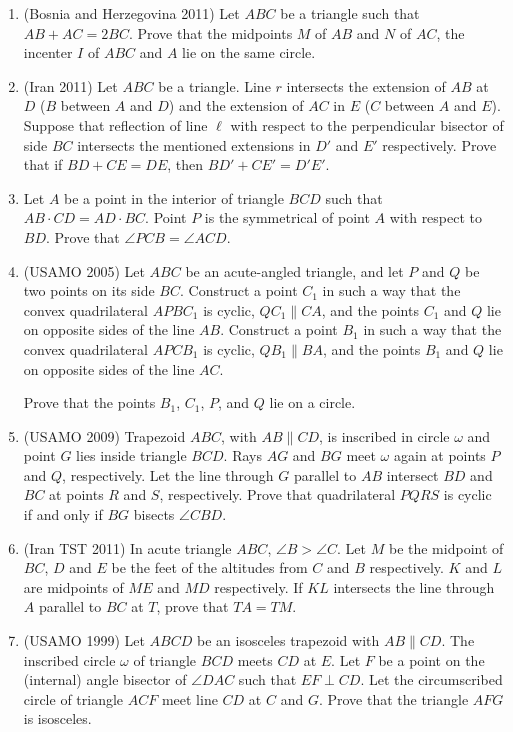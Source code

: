 \documentclass[10pt]{article}
\theoremstyle{definition}
\theoremstyle{remark}
\begin{document}
\begin{enumerate}
\item (Bosnia and Herzegovina 2011) Let $ABC$ be a triangle such that $AB + AC = 2BC$. Prove that the midpoints $M$ of $AB$ and $N$ of $AC$, the incenter $I$ of $ABC$ and $A$ lie on the same circle.

\item (Iran 2011) Let $ABC$ be a triangle. Line $r$ intersects the extension of $AB$ at $D$ ($B$ between $A$ and $D$) and the extension of $AC$ in $E$ ($C$ between $A$ and $E$). Suppose that reflection of line $\ell$ with respect to the perpendicular bisector of side $BC$ intersects the mentioned extensions in $D'$ and $E'$ respectively. Prove that if $BD + CE = DE$, then $BD' + CE' = D'E'$.

\item Let $A$ be a point in the interior of triangle $BCD$ such that $AB\cdot CD = AD\cdot BC$. Point $P$ is the symmetrical of point $A$ with respect to $BD$. Prove that $\angle PCB=\angle ACD$.

\item (USAMO 2005) Let $ABC$ be an acute-angled triangle, and let $P$ and $Q$ be two points on its side $BC$. Construct a point $C_1$ in such a way that the convex quadrilateral $APBC_1$ is cyclic, $QC_1\parallel CA$, and the points $C_1$ and $Q$ lie on opposite sides of the line $AB$. Construct a point $B_1$ in such a way that the convex quadrilateral $APCB_1$ is cyclic, $QB_1\parallel BA$, and the points $B_1$ and $Q$ lie on opposite sides of the line $AC$.

Prove that the points $B_1$, $C_1$, $P$, and $Q$ lie on a circle.

\item (USAMO 2009) Trapezoid $ABC$, with $AB \parallel CD$, is inscribed in circle $\omega$ and point $G$ lies inside triangle $BCD$. Rays $AG$ and  $BG$ meet $\omega$ again at points $P$ and $Q$, respectively. Let the line through $G$ parallel to $AB$ intersect $BD$ and $BC$ at points $R$ and $S$, respectively. Prove that quadrilateral $PQRS$ is cyclic if and only if $BG$ bisects $\angle CBD$.

\item (Iran TST 2011) In acute triangle $ABC$, $\angle B > \angle C$. Let $M$ be the midpoint of $BC$, $D$ and $E$ be the feet of the altitudes from $C$ and $B$ respectively. $K$ and $L$ are midpoints of $ME$ and $MD$ respectively. If $KL$ intersects the line through $A$ parallel to $BC$ at $T$, prove that $TA = TM$.

\item (USAMO 1999) Let $ABCD$ be an isosceles trapezoid with $AB \parallel CD$. The inscribed circle $\omega$ of triangle $BCD$ meets $CD$ at $E$. Let $F$ be a point on the (internal) angle bisector of $\angle DAC$ such that $EF \perp CD$. Let the circumscribed circle of triangle $ACF$ meet line $CD$ at $C$ and $G$. Prove that the triangle $AFG$ is isosceles.


\end{enumerate}
\end{document}
